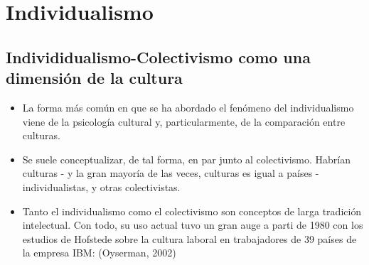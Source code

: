 \documentclass[12pt,twoside]{templates/facsothesis}
\providecommand{\tightlist}{%
  \setlength{\itemsep}{0pt}\setlength{\parskip}{0pt}}
\begin{document}
\hypertarget{individualismo}{%
\section{Individualismo}\label{individualismo}}

\hypertarget{individidualismo-colectivismo-como-una-dimensiuxf3n-de-la-cultura}{%
\subsection{Individidualismo-Colectivismo como una dimensión de la cultura}\label{individidualismo-colectivismo-como-una-dimensiuxf3n-de-la-cultura}}

\begin{itemize}
\tightlist
\item
  La forma más común en que se ha abordado el fenómeno del individualismo viene de la psicología cultural y, particularmente, de la comparación entre culturas.
\item
  Se suele conceptualizar, de tal forma, en par junto al colectivismo. Habrían culturas - y la gran mayoría de las veces, culturas es igual a países - individualistas, y otras colectivistas.
\item
  Tanto el individualismo como el colectivismo son conceptos de larga tradición intelectual. Con todo, su uso actual tuvo un gran auge a parti de 1980 con los estudios de Hofstede sobre la cultura laboral en trabajadores de 39 países de la empresa IBM: (Oyserman, 2002)


\end{itemize}
\end{document}

